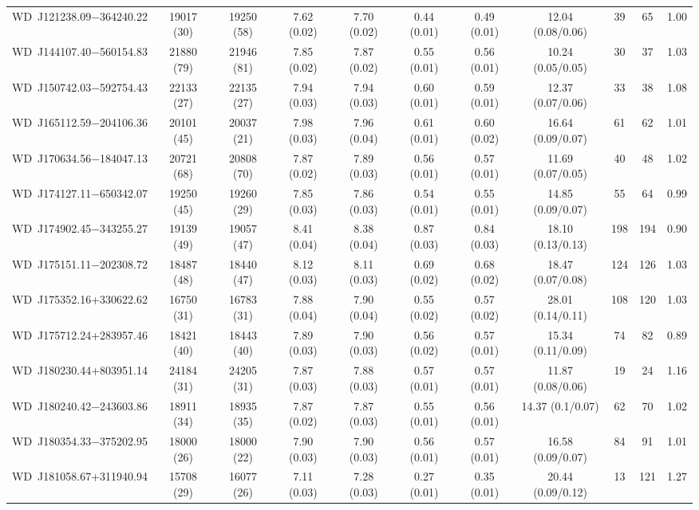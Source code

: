 \documentclass[fleqn,usenatbib, useAMS]{mnras}
\begin{document}
\begin{table*}
\begin{tabular}{ccccccccccc}
WD\	J121238.09$-$364240.22	&	19017	(30)	&	19250	(58)	&	7.62	(0.02)	&	7.70	(0.02)	&	0.44	(0.01)	&	0.49	(0.01)	&	12.04	(0.08/0.06)	&	39	&	65	&	1.00	\\
WD\	J144107.40$-$560154.83	&	21880	(79)	&	21946	(81)	&	7.85	(0.02)	&	7.87	(0.02)	&	0.55	(0.01)	&	0.56	(0.01)	&	10.24	(0.05/0.05)	&	30	&	37	&	1.03	\\
WD\	J150742.03$-$592754.43	&	22133	(27)	&	22135	(27)	&	7.94	(0.03)	&	7.94	(0.03)	&	0.60	(0.01)	&	0.59	(0.01)	&	12.37	(0.07/0.06)	&	33	&	38	&	1.08	\\
WD\	J165112.59$-$204106.36	&	20101	(45)	&	20037	(21)	&	7.98	(0.03)	&	7.96	(0.04)	&	0.61	(0.01)	&	0.60	(0.02)	&	16.64	(0.09/0.07)	&	61	&	62	&	1.01	\\
WD\	J170634.56$-$184047.13	&	20721	(68)	&	20808	(70)	&	7.87	(0.02)	&	7.89	(0.03)	&	0.56	(0.01)	&	0.57	(0.01)	&	11.69	(0.07/0.05)	&	40	&	48	&	1.02	\\
WD\	J174127.11$-$650342.07	&	19250	(45)	&	19260	(29)	&	7.85	(0.03)	&	7.86	(0.03)	&	0.54	(0.01)	&	0.55	(0.01)	&	14.85	(0.09/0.07)	&	55	&	64	&	0.99	\\
WD\	J174902.45$-$343255.27	&	19139	(49)	&	19057	(47)	&	8.41	(0.04)	&	8.38	(0.04)	&	0.87	(0.03)	&	0.84	(0.03)	&	18.10	(0.13/0.13)	&	198	&	194	&	0.90	\\
WD\	J175151.11$-$202308.72	&	18487	(48)	&	18440	(47)	&	8.12	(0.03)	&	8.11	(0.03)	&	0.69	(0.02)	&	0.68	(0.02)	&	18.47	(0.07/0.08)	&	124	&	126	&	1.03	\\
WD\	J175352.16+330622.62	&	16750	(31)	&	16783	(31)	&	7.88	(0.04)	&	7.90	(0.04)	&	0.55	(0.02)	&	0.57	(0.02)	&	28.01	(0.14/0.11)	&	108	&	120	&	1.03	\\
WD\	J175712.24+283957.46	&	18421	(40)	&	18443	(40)	&	7.89	(0.03)	&	7.90	(0.03)	&	0.56	(0.02)	&	0.57	(0.01)	&	15.34	(0.11/0.09)	&	74	&	82	&	0.89	\\
WD\	J180230.44+803951.14	&	24184	(31)	&	24205	(31)	&	7.87	(0.03)	&	7.88	(0.03)	&	0.57	(0.01)	&	0.57	(0.01)	&	11.87	(0.08/0.06)	&	19	&	24	&	1.16	\\
WD\	J180240.42$-$243603.86	&	18911	(34)	&	18935	(35)	&	7.87	(0.02)	&	7.87	(0.03)	&	0.55	(0.01)	&	0.56	(0.01)	&	14.37	(0.1/0.07)	&	62	&	70	&	1.02	\\
WD\	J180354.33$-$375202.95	&	18000	(26)	&	18000	(22)	&	7.90	(0.03)	&	7.90	(0.03)	&	0.56	(0.01)	&	0.57	(0.01)	&	16.58	(0.09/0.07)	&	84	&	91	&	1.01	\\
WD\	J181058.67+311940.94	&	15708	(29)	&	16077	(26)	&	7.11	(0.03)	&	7.28	(0.03)	&	0.27	(0.01)	&	0.35	(0.01)	&	20.44	(0.09/0.12)	&	13	&	121	&	1.27	\\

\end{tabular}
\end{table*}
\end{document}
